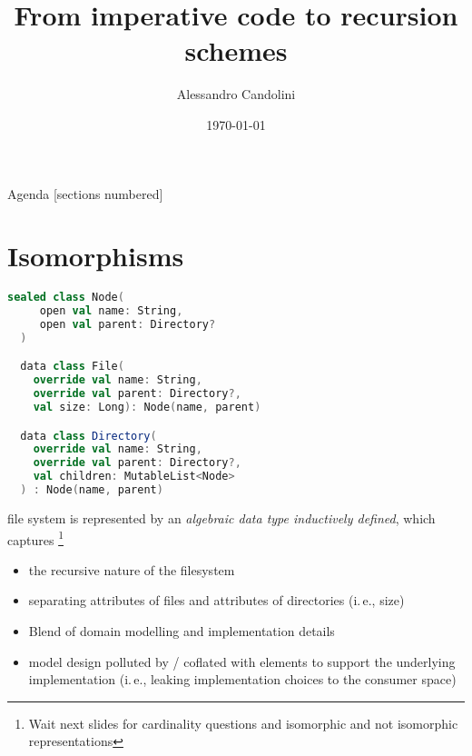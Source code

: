 \documentclass[10pt]{beamer}
\title{From imperative code to recursion schemes}
\date{\today}
\author[Alessandro Candolini]{Alessandro Candolini}
\providecommand{\ie}{i.\,e.}
\begin{document}
\maketitle

\begin{frame}{Agenda}
  [sections numbered]
  \tableofcontents[hideallsubsections]
\end{frame}

\section{Isomorphisms}
\begin{frame}[fragile]
  \begin{lstlisting}[language=scala]
  sealed class Node(
     open val name: String, 
     open val parent: Directory?
  )

  data class File(
    override val name: String, 
    override val parent: Directory?, 
    val size: Long): Node(name, parent)

  data class Directory(
    override val name: String,
    override val parent: Directory?,
    val children: MutableList<Node>
  ) : Node(name, parent)
  \end{lstlisting}
\end{frame}

\begin{frame}[fragile]
  file system is represented by an \emph{algebraic data type inductively defined}, which captures%
  \footnote{Wait next slides for cardinality questions and isomorphic and not isomorphic representations}
  \begin{itemize}
    \item the recursive nature of the filesystem 
    \item separating attributes of files and attributes of directories (\ie, size) 
  \end{itemize}
\end{frame}
\begin{frame}[fragile]
  \begin{itemize}
    \item Blend of domain modelling and implementation details 
    \item model design polluted by / coflated with elements to support the underlying implementation (\ie, leaking implementation choices to the consumer space)
  \end{itemize} 
\end{frame}
\end{document}
